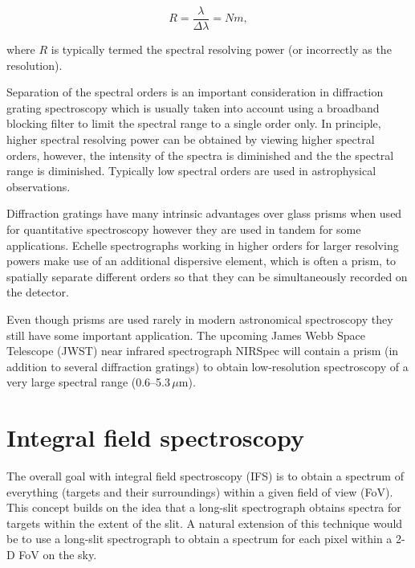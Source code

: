 \begin{equation}
    R = \frac{\lambda}{\Delta\lambda} = Nm,\label{eq:g}
\end{equation}

\noindent where $R$ is typically termed the spectral resolving power (or incorrectly as the resolution).

Separation of the spectral orders is an important consideration in diffraction grating spectroscopy which is usually taken into account using a broadband blocking filter to limit the spectral range to a single order only.
In principle, higher spectral resolving power can be obtained by viewing higher spectral orders, however, the intensity of the spectra is diminished and the the spectral range is diminished.
Typically low spectral orders are used in astrophysical observations.

Diffraction gratings have many intrinsic advantages over glass prisms when used for quantitative spectroscopy however they are used in tandem for some applications.
Echelle spectrographs working in higher orders for larger resolving powers make use of an additional dispersive element, which is often a prism, to spatially separate different orders so that they can be simultaneously recorded on the detector.


Even though prisms are used rarely in modern astronomical spectroscopy they still have some important application.
The upcoming James Webb Space Telescope (JWST) near infrared spectrograph NIRSpec will contain a prism (in addition to several diffraction gratings) to obtain low-resolution spectroscopy of a very large spectral range (0.6--5.3\,$\mu$m).


\section{Integral field spectroscopy} %
\label{sec:IFS}

The overall goal with integral field spectroscopy (IFS) is to obtain a spectrum of everything (targets and their surroundings) within a given field of view (FoV).
This concept builds on the idea that a long-slit spectrograph obtains spectra for targets within the extent of the slit.
A natural extension of this technique would be to use a long-slit spectrograph to obtain a spectrum for each pixel within a 2-D FoV on the sky.

